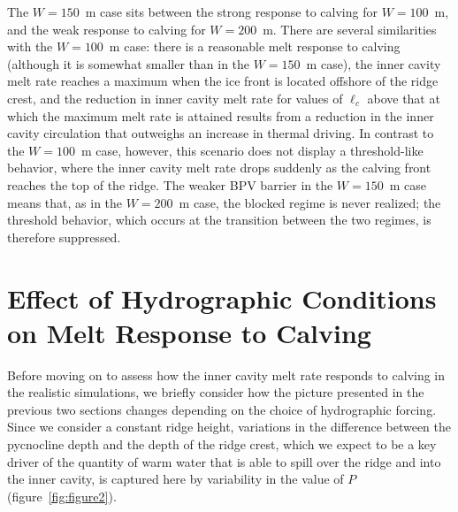 \documentclass[draft]{agujournal2019}
\begin{document}
The $W = 150$~m case sits between the strong response to calving for $W = 100$~m, and the weak response to calving for $W = 200$~m. There are several similarities with the $W = 100$~m case: there is a reasonable melt response to calving (although it is somewhat smaller than in the $W = 150$~m case), the inner cavity melt rate reaches a maximum when the ice front is located offshore of the ridge crest, and the reduction in inner cavity melt rate for values of $\ell_c$ above that at which the maximum melt rate is attained results from a reduction in the inner cavity circulation that outweighs an increase in thermal driving. In contrast to the $W = 100$~m case, however, this scenario does not display a threshold-like behavior, where the inner cavity melt rate drops suddenly as the calving front reaches the top of the ridge. The weaker BPV barrier in the $W=150$~m case means that, as in the $W = 200$~m case, the blocked regime is never realized; the threshold behavior, which occurs at the transition between the two regimes, is therefore suppressed.


\section{Effect of Hydrographic Conditions on Melt Response to Calving}\label{S:Results:P}
Before moving on to assess how the inner cavity melt rate responds to calving in the realistic simulations, we briefly consider how the picture presented in the previous two sections changes depending on the choice of hydrographic forcing. Since we consider a constant ridge height, variations in the difference between the pycnocline depth and the depth of the ridge crest, which we expect to be a key driver of the quantity of warm water that is able to spill over the ridge and into the inner cavity, is captured here by variability in the value of $P$ (figure~\ref{fig:figure2}).
\end{document}
